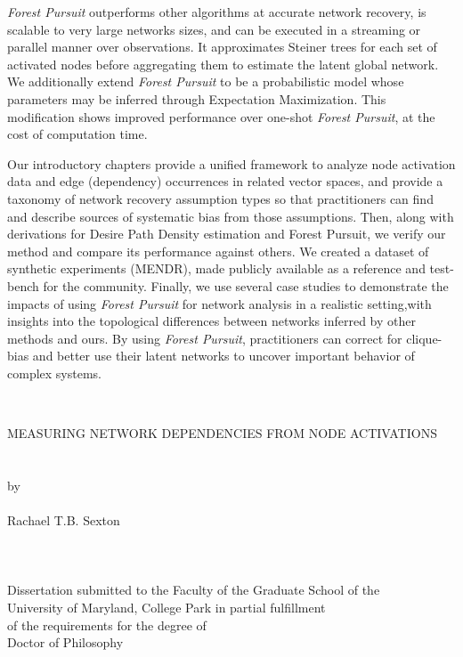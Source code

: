 \documentclass[%
	12pt,
		oneside,
		letterpaper
]{book}
\begin{document}
\emph{Forest Pursuit} outperforms other algorithms at accurate network recovery, is scalable to very large networks sizes, and can be executed in a streaming or parallel manner over observations.
It approximates Steiner trees for each set of activated nodes before aggregating them to estimate the latent global network.
We additionally extend \emph{Forest Pursuit} to be a probabilistic model whose parameters may be inferred through Expectation Maximization.
This modification shows improved performance over one-shot \emph{Forest Pursuit}, at the cost of computation time.

Our introductory chapters provide a unified framework to analyze node activation data and edge (dependency) occurrences in related vector spaces, and provide a taxonomy of network recovery assumption types so that practitioners can find and describe sources of systematic bias from those assumptions.
Then, along with derivations for Desire Path Density estimation and Forest Pursuit, we verify our method and compare its performance against others.
We created a dataset of synthetic experiments (MENDR), made publicly available as a reference and test-bench for the community.
Finally, we use several case studies to demonstrate the impacts of using \emph{Forest Pursuit} for network analysis in a realistic setting,with insights into the topological differences between networks inferred by other methods and ours.
By using \emph{Forest Pursuit}, practitioners can correct for clique-bias and better use their latent networks to uncover important behavior of complex systems.\par
\clearpage%

\thispagestyle{empty} \hbox{\ } \vspace{1.5in}
\singlespacing
\small\normalsize
\begin{center}

\large{\uppercase{Measuring Network Dependencies from Node Activations}}\\
\ \\ 
\ \\
\large{by} \\
\ \\
\large{Rachael T.B. Sexton}
\ \\
\ \\
\ \\
\ \\
\normalsize
Dissertation submitted to the Faculty of the Graduate School of the \\
University of Maryland, College Park in partial fulfillment \\
of the requirements for the degree of \\
Doctor of Philosophy \\

\end{center}
\end{document}
